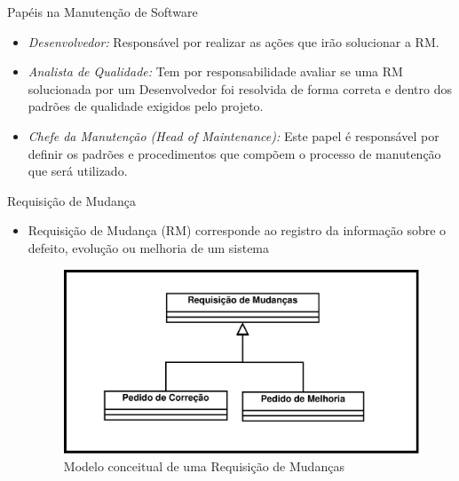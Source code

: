 \documentclass[t,14pt,mathserif]{beamer}
\begin{document}
\begin{frame}{Papéis na Manutenção de Software}
	\begin{itemize}

        \item \textit{Desenvolvedor:} Responsável por realizar as ações que irão
            solucionar a RM\@.

        \item \textit{Analista de Qualidade:} Tem por responsabilidade avaliar
              se uma RM solucionada por um Desenvolvedor foi resolvida de forma
              correta e dentro dos padrões de qualidade exigidos pelo projeto.

        \item \textit{Chefe da Manutenção (Head of Maintenance):} Este papel é
            responsável por definir os padrões e procedimentos que compõem o
            processo de manutenção que será utilizado.
	\end{itemize}
\end{frame}

\begin{frame}{Requisição de Mudança}
	\begin{itemize}
        \item Requisição de Mudança (RM) corresponde ao registro da informação
            sobre o defeito, evolução ou melhoria de um
            sistema~\cite{tripathy2014software}
        \begin{figure}[htpb]
            \centering
            \includegraphics[width=0.75\linewidth]{../img/diagrama-classe-conceitual-requisicao-mudancas.pdf}
            \caption{Modelo conceitual de uma Requisição de Mudanças}
\label{fig:diagrama-classe-requisicao-mudancas}
        \end{figure}
	\end{itemize}
\end{frame}
\end{document}
